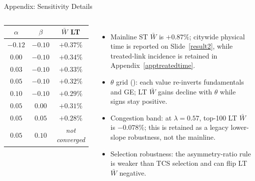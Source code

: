 \documentclass[11pt,aspectratio=169]{beamer}
\newcommand{\app}[1]{\allowbreak\hspace{0.25em}\hyperlink{#1}{\beamergotobutton{details}}}
\newcommand{\navback}[1]{\par\vspace{0.35em}\noindent\hfill\hyperlink{#1}{\beamerreturnbutton{back}}}
\begin{document}
\begin{frame}[label=appsensdetail]{Appendix: Sensitivity Details}
\scriptsize
\begin{columns}[T,onlytextwidth]
\begin{flushright}
\setlength{\tabcolsep}{4pt}
\begin{tabular}{ccc}
\toprule
$\alpha$ & $\beta$ & $\bar W$ LT \\
\midrule
$-0.12$ & $-0.10$ & $+0.37\%$ \\
$0.00$ & $-0.10$ & $+0.34\%$ \\
$0.03$ & $-0.10$ & $+0.33\%$ \\
$\mathbf{0.05}$ & $\mathbf{-0.10}$ & $\mathbf{+0.32\%}$ \\
$0.10$ & $-0.10$ & $+0.29\%$ \\
$0.05$ & $0.00$ & $+0.31\%$ \\
$0.05$ & $0.05$ & $+0.28\%$ \\
$0.05$ & $0.10$ & \emph{not converged} \\
\bottomrule
\end{tabular}
\end{flushright}
\begin{itemize}\footnotesize
  \item Mainline ST $\bar W$ is $+0.87\%$; citywide physical time is reported on Slide~\ref{result2}, while treated-link incidence is retained in Appendix~\ref{apptreatedtime}.
  \item $\theta$ grid (\app{appsens_theta}): each value re-inverts fundamentals and GE; LT $\bar W$ gains decline with $\theta$ while signs stay positive.
  \item Congestion band: at $\lambda=0.57$, top-100 LT $\bar W$ is $-0.078\%$; this is retained as a legacy lower-slope robustness, not the mainline.
  \item Selection robustness: the asymmetry-ratio rule is weaker than TCS selection and can flip LT $\bar W$ negative.
\end{itemize}
\end{columns}
\navback{appsens}
\end{frame}
\end{document}
